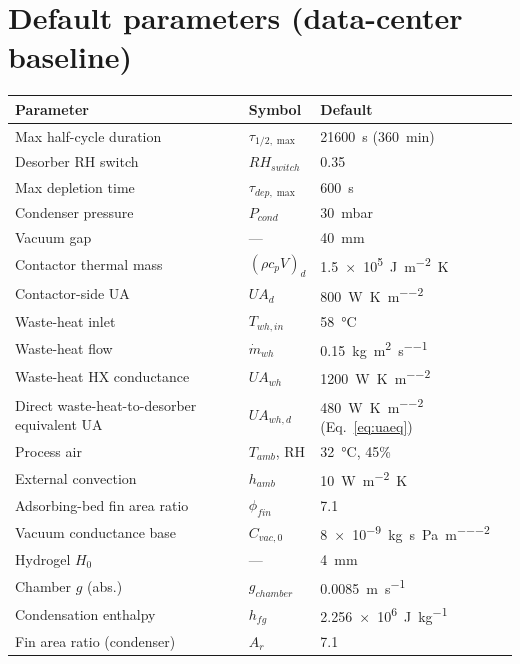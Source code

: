 \documentclass[11pt]{article}
\begin{document}
\section{Default parameters (data-center baseline)}

\begin{table}[h]
\centering
\small
\begin{tabular}{@{}lll@{}}
\toprule
\textbf{Parameter} & \textbf{Symbol} & \textbf{Default} \\
\midrule
Max half-cycle duration & $\tau_{1/2,\max}$ & \SI{21600}{\second} (\SI{360}{\minute}) \\
Desorber RH switch & $RH_{switch}$ & 0.35 \\
Max depletion time & $\tau_{dep,\max}$ & \SI{600}{\second} \\
Condenser pressure & $P_{cond}$ & \SI{30}{\milli\bar} \\
Vacuum gap & --- & \SI{40}{\milli\metre} \\
Contactor thermal mass & $(\rho c_p V)_d$ & \SI{1.5e5}{\joule\per\metre\squared\kelvin} \\
Contactor-side UA & $UA_d$ & \SI{800}{\watt\per\kelvin\per\metre\squared} \\
Waste-heat inlet & $T_{wh,in}$ & \SI{58}{\celsius} \\
Waste-heat flow & $\dot{m}_{wh}$ & \SI{0.15}{\kilogram\per\metre\squared\per\second} \\
Waste-heat HX conductance & $UA_{wh}$ & \SI{1200}{\watt\per\kelvin\per\metre\squared} \\
Direct waste-heat-to-desorber equivalent UA & $UA_{wh,d}$ & \SI{480}{\watt\per\kelvin\per\metre\squared} (Eq.~\eqref{eq:uaeq}) \\
Process air & $T_{amb}$, RH & \SI{32}{\celsius}, 45\% \\
External convection & $h_{amb}$ & \SI{10}{\watt\per\metre\squared\kelvin} \\
Adsorbing-bed fin area ratio & $\phi_{fin}$ & 7.1 \\
Vacuum conductance base & $C_{vac,0}$ & \SI{8e-9}{\kilogram\per\second\per\pascal\per\metre\squared} \\
Hydrogel $H_0$ & --- & \SI{4}{\milli\metre} \\
Chamber $g$ (abs.) & $g_{chamber}$ & \SI{0.0085}{\metre\per\second} \\
Condensation enthalpy & $h_{fg}$ & \SI{2.256e6}{\joule\per\kilogram} \\
Fin area ratio (condenser) & $A_r$ & 7.1 \\
\bottomrule
\end{tabular}
\end{table}
\end{document}
